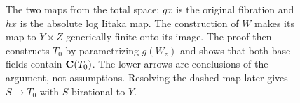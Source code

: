 \begin{figure}[ht]
\centering
{}
\caption{The two maps from the total space: $g x$ is the original
fibration and $h x$ is the absolute log Iitaka map. The construction
of $W$ makes its map to $Y\times Z$ generically finite onto its image. The proof
then constructs $T_0$ by parametrizing $g(W_z)$ and shows that both
base fields contain $\mathbf C(T_0)$. The lower arrows are conclusions of
the argument, not assumptions. Resolving the dashed map later
gives $S\to T_0$ with $S$ birational to $Y$.}
\label{fig:combined-base}
\end{figure}
